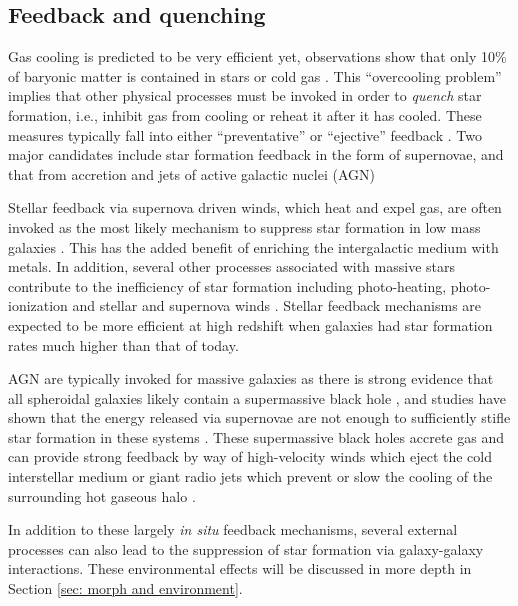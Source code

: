 \subsection{Feedback and quenching}

Gas cooling is predicted to be very efficient yet, observations show that only 10\% of baryonic matter is contained in stars or cold gas \citep{Fukugita2004}. This ``overcooling problem'' implies that other physical processes must be invoked in order to \textit{quench} star formation, i.e., inhibit gas from cooling or reheat it after it has cooled. These measures typically fall into either ``preventative'' or ``ejective'' feedback \citep{Gabor2010,Keres2009b}. Two major candidates include star formation feedback in the form of supernovae, and that from accretion and jets of active galactic nuclei (AGN)

Stellar feedback via supernova driven winds, which heat and expel gas, are often invoked as the most likely mechanism to suppress star formation in low mass galaxies \citep{DekelSilk1986,White1978}. This has the added benefit of enriching the intergalactic medium with metals. In addition, several other processes associated with massive stars contribute to the inefficiency of star formation including photo-heating, photo-ionization and stellar and supernova winds \citep[e.g., review by][]{Hopkins2012}. Stellar feedback mechanisms are expected to be more efficient at high redshift when galaxies had star formation rates much higher than that of today. 

AGN are typically invoked for massive galaxies as there is strong evidence that all spheroidal galaxies likely contain a supermassive black hole \citep{KormendyHo2013}, and studies have shown that the energy released via supernovae are not enough to sufficiently stifle star formation in these systems \citep{Springel2005}. These supermassive black holes accrete gas and can provide strong feedback by way of high-velocity winds which eject the cold interstellar medium or giant radio jets which prevent or slow the cooling of the surrounding hot gaseous halo \citep{Fabian2012,HeckmanBest2014}.  

In addition to these largely \textit{in situ} feedback mechanisms, several external processes can also lead to the suppression of star formation via galaxy-galaxy interactions. These environmental effects will be discussed in more depth in Section \ref{sec: morph and environment}. 


